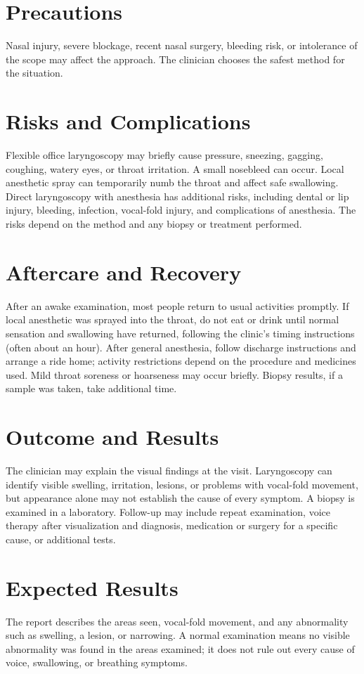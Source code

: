 \section*{Precautions}
Nasal injury, severe blockage, recent nasal surgery, bleeding risk, or intolerance of the scope may affect the approach. The clinician chooses the safest method for the situation.

\section*{Risks and Complications}
Flexible office laryngoscopy may briefly cause pressure, sneezing, gagging, coughing, watery eyes, or throat irritation. A small nosebleed can occur. Local anesthetic spray can temporarily numb the throat and affect safe swallowing. Direct laryngoscopy with anesthesia has additional risks, including dental or lip injury, bleeding, infection, vocal-fold injury, and complications of anesthesia. The risks depend on the method and any biopsy or treatment performed.

\section*{Aftercare and Recovery}
After an awake examination, most people return to usual activities promptly. If local anesthetic was sprayed into the throat, do not eat or drink until normal sensation and swallowing have returned, following the clinic's timing instructions (often about an hour). After general anesthesia, follow discharge instructions and arrange a ride home; activity restrictions depend on the procedure and medicines used. Mild throat soreness or hoarseness may occur briefly. Biopsy results, if a sample was taken, take additional time.

\section*{Outcome and Results}
The clinician may explain the visual findings at the visit. Laryngoscopy can identify visible swelling, irritation, lesions, or problems with vocal-fold movement, but appearance alone may not establish the cause of every symptom. A biopsy is examined in a laboratory. Follow-up may include repeat examination, voice therapy after visualization and diagnosis, medication or surgery for a specific cause, or additional tests.

\section*{Expected Results}
The report describes the areas seen, vocal-fold movement, and any abnormality such as swelling, a lesion, or narrowing. A normal examination means no visible abnormality was found in the areas examined; it does not rule out every cause of voice, swallowing, or breathing symptoms.

